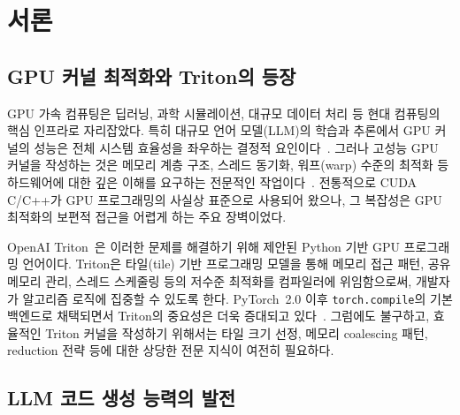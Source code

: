 \documentclass[sigplan,screen,review,anonymous]{acmart}
\begin{document}



\maketitle


\section{서론}\label{sec:introduction}

\subsection{GPU 커널 최적화와 Triton의 등장}

GPU 가속 컴퓨팅은 딥러닝, 과학 시뮬레이션, 대규모 데이터 처리 등
현대 컴퓨팅의 핵심 인프라로 자리잡았다.
특히 대규모 언어 모델(LLM)의 학습과 추론에서 GPU 커널의 성능은
전체 시스템 효율성을 좌우하는 결정적 요인이다~\cite{dao2022flashattention}.
그러나 고성능 GPU 커널을 작성하는 것은 메모리 계층 구조, 스레드 동기화,
워프(warp) 수준의 최적화 등 하드웨어에 대한 깊은 이해를 요구하는
전문적인 작업이다~\cite{kirk2016programming}.
전통적으로 CUDA C/C++가 GPU 프로그래밍의 사실상 표준으로 사용되어 왔으나,
그 복잡성은 GPU 최적화의 보편적 접근을 어렵게 하는 주요 장벽이었다.

OpenAI Triton~\cite{tillet2019triton}은 이러한 문제를 해결하기 위해
제안된 Python 기반 GPU 프로그래밍 언어이다.
Triton은 타일(tile) 기반 프로그래밍 모델을 통해
메모리 접근 패턴, 공유 메모리 관리, 스레드 스케줄링 등의
저수준 최적화를 컴파일러에 위임함으로써,
개발자가 알고리즘 로직에 집중할 수 있도록 한다.
PyTorch~2.0 이후 \texttt{torch.compile}의 기본 백엔드로 채택되면서
Triton의 중요성은 더욱 증대되고 있다~\cite{ansel2024pytorch2}.
그럼에도 불구하고, 효율적인 Triton 커널을 작성하기 위해서는
타일 크기 선정, 메모리 coalescing 패턴, reduction 전략 등에 대한
상당한 전문 지식이 여전히 필요하다.

\subsection{LLM 코드 생성 능력의 발전}
\end{document}
